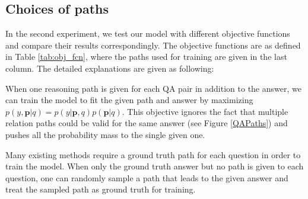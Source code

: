 \begin{table}[h]\centering
{}
\caption{\fontsize{10}{12}\selectfont We break test set into two groups based on number of paths associated with them and report F1.}\label{tab:wqsp_cwq_path_break}
\end{table}

\subsection{Choices of paths} 
In the second experiment, we test our model with different objective functions and compare their results correspondingly. The objective functions are as defined in Table \ref{tab:obj_fcn}, where the paths used for training are given in the last column. The detailed explanations are given as following:

When one reasoning path is given for each QA pair in addition to the answer, we can train the model to fit the given path and answer by maximizing $p(y,\mathbf{p}|q)=p(y|\mathbf{p},q)p(\mathbf{p}|q)$. This objective ignores the fact that multiple relation paths could be valid for the same answer (see Figure \ref{QAPaths}) and pushes all the probability mass to the single given one.

Many existing methods require a ground truth path for each question in order to train the model.
When only the ground truth answer but no path is given to each question, one can randomly sample a path that leads to the given answer and treat the sampled path as ground truth for training.

